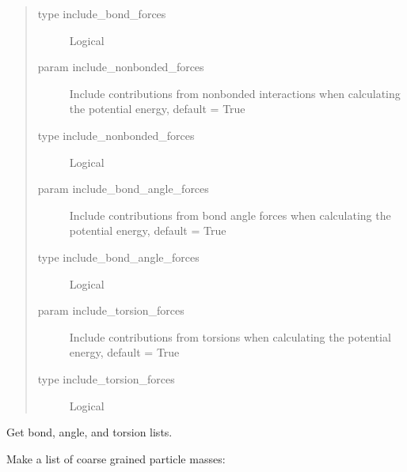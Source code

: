 \documentclass[letterpaper,12pt,english,openany,oneside]{sphinxmanual}
\begin{document}
\begin{fulllineitems}
\begin{description}
\begin{quote}
\begin{description}
\item[{type include\_bond\_forces}] \leavevmode
Logical

\item[{param include\_nonbonded\_forces}] \leavevmode
Include contributions from nonbonded interactions when calculating the potential energy, default = True

\item[{type include\_nonbonded\_forces}] \leavevmode
Logical

\item[{param include\_bond\_angle\_forces}] \leavevmode
Include contributions from bond angle forces when calculating the potential energy, default = True

\item[{type include\_bond\_angle\_forces}] \leavevmode
Logical

\item[{param include\_torsion\_forces}] \leavevmode
Include contributions from torsions when calculating the potential energy, default = True

\item[{type include\_torsion\_forces}] \leavevmode
Logical

\end{description}\end{quote}

\end{description}

\begin{fulllineitems}
\label{\detokenize{cg_model:cg_model.cgmodel.CGModel.check_energy_conservation}}
Get bond, angle, and torsion lists.

\end{fulllineitems}


\begin{fulllineitems}
\label{\detokenize{cg_model:cg_model.cgmodel.CGModel.constrain_bonds}}
Make a list of coarse grained particle masses:


\end{fulllineitems}
\end{fulllineitems}
\end{document}
